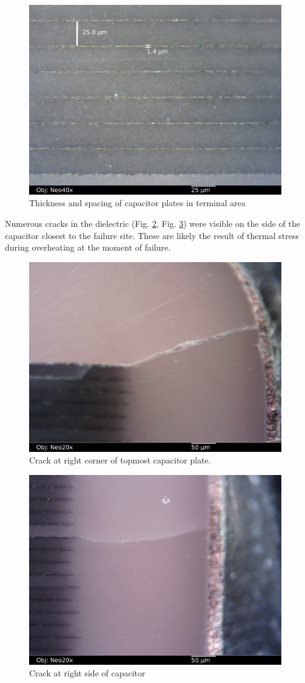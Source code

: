 \documentclass{article}
\begin{document}
\begin{figure}[h]
\includegraphics[width=11cm,keepaspectratio]{section1_09_df_neo40x_annotated2.jpg}
\caption{Thickness and spacing of capacitor plates in terminal area}
\label{plate-dimensions}
\end{figure}

Numerous cracks in the dielectric (Fig. \ref{cracks1}, Fig. \ref{cracks2}) were visible on the side of the capacitor
closest to the failure site. These are likely the result of thermal stress during overheating at the moment of failure.

\begin{figure}[h]
\includegraphics[width=11cm,keepaspectratio]{section1_05_df_neo20x_annotated.jpg}
\caption{Crack at right corner of topmost capacitor plate.}
\label{cracks1}
\end{figure}

\begin{figure}[h]
\includegraphics[width=11cm,keepaspectratio]{section1_06_df_neo20x_annotated.jpg}
\caption{Crack at right side of capacitor}
\label{cracks2}
\end{figure}
\end{document}
